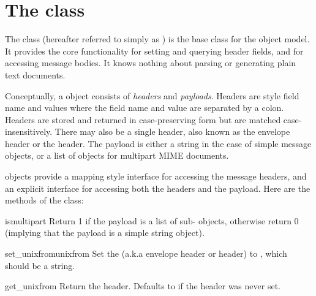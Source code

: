 \documentclass{howto}
\begin{document}
\section{The  class}

The  class (hereafter referred to simply as
) is the base class for the
 object model.  It provides the core functionality for
setting and querying header fields, and for accessing message bodies.
It knows nothing about parsing or generating plain text documents.

Conceptually, a  object consists of \emph{headers} and
\emph{payloads}.  Headers are  style field name and
values where the field name and value are separated by a colon.
Headers are stored and returned in case-preserving form but are
matched case-insensitively.  There may also be a single
 header, also known as the envelope header or the
 header.  The payload is either a string in the case of
simple message objects, or a list of  objects for
multipart MIME documents.

 objects provide a mapping style interface for
accessing the message headers, and an explicit interface for accessing
both the headers and the payload.  Here are the methods of the
 class:

\begin{methoddesc}[Message]{ismultipart}{}
Return 1 if the payload is a list of sub- objects,
otherwise return 0 (implying that the payload is a simple string
object).
\end{methoddesc}

\begin{methoddesc}[Message]{set_unixfrom}{unixfrom}
Set the  (a.k.a envelope header or 
header) to , which should be a string.
\end{methoddesc}

\begin{methoddesc}[Message]{get_unixfrom}{}
Return the  header.  Defaults to  if the
 header was never set.
\end{methoddesc}
\end{document}
